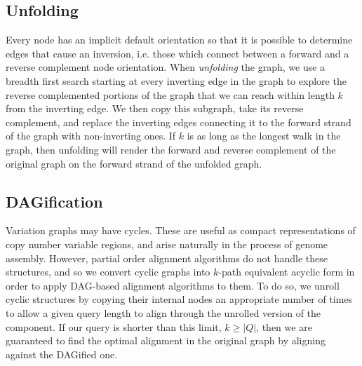 



\subsection{Unfolding}

Every node has an implicit default orientation so that it is possible to determine edges that cause an inversion, i.e. those which connect between a forward and a reverse complement node orientation. 
When \emph{unfolding} the graph, we use a breadth first search starting at every inverting edge in the graph to explore the reverse complemented portions of the graph that we can reach within length $k$ from the inverting edge.
We then copy this subgraph, take its reverse complement, and replace the inverting edges connecting it to the forward strand of the graph with non-inverting ones.
If $k$ is as long as the longest walk in the graph, then unfolding will render the forward and reverse complement of the original graph on the forward strand of the unfolded graph.

\subsection{DAGification}
\label{sec:DAGify}

Variation graphs may have cycles.
These are useful as compact representations of copy number variable regions, and arise naturally in the process of genome assembly.
However, partial order alignment algorithms do not handle these structures, and so we convert cyclic graphs into $k$-path equivalent acyclic form in order to apply DAG-based alignment algorithms to them.
To do so, we unroll cyclic structures by copying their internal nodes an appropriate number of times to allow a given query length to align through the unrolled version of the component.
If our query is shorter than this limit, $k \geq |Q|$, then we are guaranteed to find the optimal alignment in the original graph by aligning against the DAGified one.

